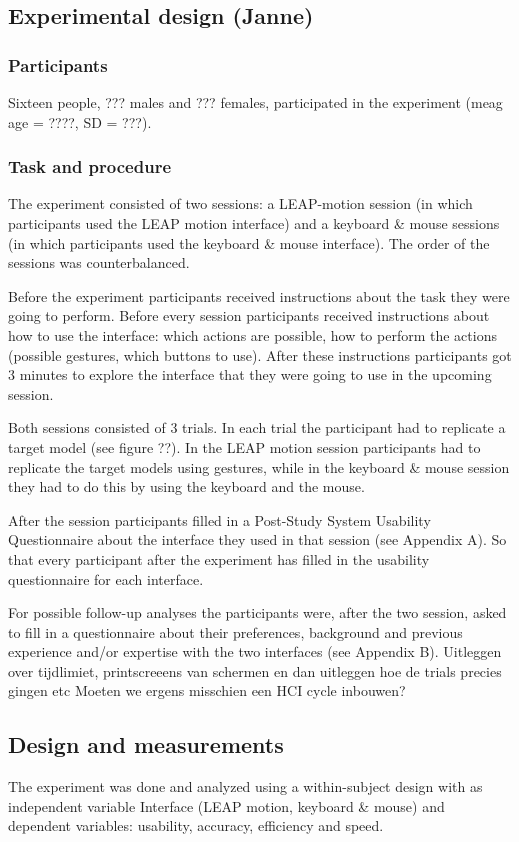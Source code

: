 \subsection{Experimental design (Janne)}
\subsubsection{Participants}
Sixteen people, ??? males and ??? females, participated in the experiment (meag age = ????, SD = ???). 
\subsubsection{Task and procedure}
The experiment consisted of two sessions: a LEAP-motion session (in which participants used the LEAP motion interface) and a keyboard \& mouse sessions (in which participants used the keyboard & mouse interface). The order of the sessions was counterbalanced.

Before the experiment participants received instructions about the task they were going to perform. Before every session participants received instructions about how to use the interface: which actions are possible, how to perform the actions (possible gestures, which buttons to use). After these instructions participants got 3 minutes to explore the interface that they were going to use in the upcoming session. 

Both sessions consisted of 3 trials. In each trial the participant had to replicate a target model (see figure ??).  In the LEAP motion session participants had to replicate the target models using gestures, while in the keyboard & mouse session they had to do this by using the keyboard and the mouse.

After the session participants filled in a Post-Study System Usability Questionnaire about the interface they used in that session (see Appendix A). So that every participant after the experiment has filled in the usability questionnaire for each interface.

For possible follow-up analyses the participants were, after the two session, asked to fill in a questionnaire about their preferences, background and previous experience and/or expertise with the two interfaces (see Appendix B). 
\newline
Uitleggen over tijdlimiet, printscreeens van schermen en dan uitleggen hoe de trials precies gingen etc
Moeten we ergens misschien een HCI cycle inbouwen?

\subsection{Design and measurements}
The experiment was done and analyzed using a within-subject design with as independent variable Interface (LEAP motion, keyboard & mouse) and dependent variables: usability, accuracy, efficiency and speed. 

